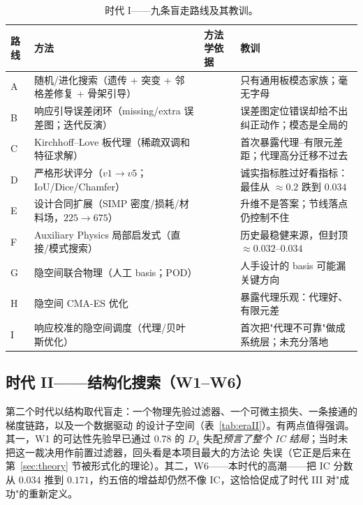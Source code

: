 \documentclass[11pt,a4paper]{article}
\newcommand{\Dfour}{D_4}
\begin{document}
\begin{table}[h]
\centering
\caption{时代 I------九条盲走路线及其教训。}
\label{tab:eraI}
\small
\begin{tabular}{@{}p{0.7cm}p{5.1cm}p{2.2cm}p{6.6cm}@{}}
\toprule
路线 & 方法 & 方法学依据 & 教训 \\
\midrule
A & 随机/进化搜索（遗传 + 突变 + 邻格差修复 + 骨架引导） & \cite{holland1975,bendsoe2003} & 只有通用板模态家族；毫无字母 \\
B & 响应引导误差闭环（missing/extra 误差图；迭代反演） & \cite{tarantola2005} & 误差图定位错误却给不出纠正动作；模态是全局的 \\
C & Kirchhoff--Love 板代理（稀疏双调和特征求解） & \cite{leissa1969,waller1939} & 首次暴露代理--有限元差距；代理高分迁移不过去 \\
D & 严格形状评分（$v1\to v5$；IoU/Dice/Chamfer） & \cite{jaccard1912,dice1945,barrow1977} & 诚实指标胜过好看指标：最佳从 $\approx0.2$ 跌到 $0.034$ \\
E & 设计合同扩展（SIMP 密度/损耗/材料场，$225\to675$） & \cite{bendsoe1989,bendsoe1999} & 升维不是答案；节线落点仍控制不住 \\
F & Auxiliary Physics 局部启发式（直接/模式搜索） & \cite{hooke1961} & 历史最稳健来源，但封顶 $\approx0.032$--$0.034$ \\
G & 隐空间联合物理（人工 basis；POD） & \cite{berkooz1993} & 人手设计的 basis 可能漏关键方向 \\
H & 隐空间 CMA-ES 优化 & \cite{hansen2001} & 暴露代理乐观：代理好、有限元差 \\
I & 响应校准的隐空间调度（代理/贝叶斯优化） & \cite{jones1998,shahriari2016} & 首次把"代理不可靠"做成系统层；未充分落地 \\
\bottomrule
\end{tabular}
\end{table}

\subsection{时代 II------结构化搜索（W1--W6）}\label{sec:eraII}
第二个时代以结构取代盲走：一个物理先验过滤器、一个可微主损失、一条接通的梯度链路，以及一个数据驱动
的设计子空间（表~\ref{tab:eraII}）。有两点值得强调。其一，W1 的可达性先验早已通过 $0.78$ 的
$\Dfour$ 失配\emph{预言了整个 IC 结局}；当时未把这一裁决用作前置过滤器，回头看是本项目最大的方法论
失误（它正是后来在第~\ref{sec:theory} 节被形式化的理论）。其二，W6------本时代的高潮------把 IC 分数
从 $0.034$ 推到 $0.171$，约五倍的增益却仍然不像 IC，这恰恰促成了时代 III 对"成功"的重新定义。
\end{document}
